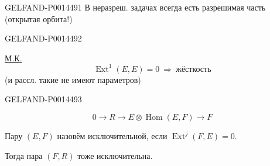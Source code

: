 \begin{GelfandAdjacentEvidence}{GELFAND-P001449}{1}
В неразреш. задачах всегда есть разрешимая часть
(открытая орбита!)

\end{GelfandAdjacentEvidence}
\begin{GelfandAdjacentEvidence}{GELFAND-P001449}{2}

\uline{М.К.}
\[
\operatorname{Ext}^{1}(E,E)=0\ \Rightarrow\ \text{жёсткость}
\]
(и рассл. такие не имеют параметров)

\end{GelfandAdjacentEvidence}
\begin{GelfandAdjacentEvidence}{GELFAND-P001449}{3}

\[
0\longrightarrow R\longrightarrow E\otimes\operatorname{Hom}(E,F)
\longrightarrow F
\]

Пару \((E,F)\) назовём исключительной, если \(\operatorname{Ext}^{j}(F,E)=0\).

Тогда пара \((F,R)\) тоже исключительна.
\end{GelfandAdjacentEvidence}
